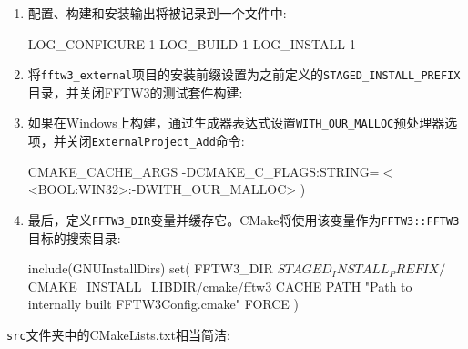 \begin{enumerate}
\item 配置、构建和安装输出将被记录到一个文件中:

\begin{codebox}[cmake]
LOG_CONFIGURE
    1
LOG_BUILD
    1
LOG_INSTALL
    1
\end{codebox}

\item 将\texttt{fftw3\_external}项目的安装前缀设置为之前定义的\texttt{STAGED\_INSTALL\_PREFIX}目录，并关闭FFTW3的测试套件构建:


\item 如果在Windows上构建，通过生成器表达式设置\texttt{WITH\_OUR\_MALLOC}预处理器选项，并关闭\texttt{ExternalProject\_Add}命令:

\begin{codebox}[cmake]
CMAKE_CACHE_ARGS
    -DCMAKE_C_FLAGS:STRING=$<$<BOOL:WIN32>:-DWITH_OUR_MALLOC>
)
\end{codebox}

\item 最后，定义\texttt{FFTW3\_DIR}变量并缓存它。CMake将使用该变量作为\texttt{FFTW3::FFTW3}目标的搜索目录:

\begin{codebox}[cmake]
include(GNUInstallDirs)
set(
  FFTW3_DIR ${STAGED_INSTALL_PREFIX}/${CMAKE_INSTALL_LIBDIR}/cmake/fftw3
  CACHE PATH "Path to internally built FFTW3Config.cmake"
  FORCE
  )
\end{codebox}

\end{enumerate}

\texttt{src}文件夹中的CMakeLists.txt相当简洁:

